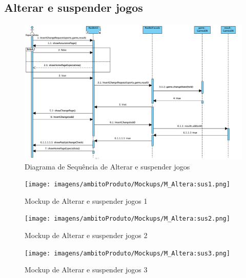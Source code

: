 \subsection{Alterar e suspender jogos}
\begin{figure}[H]
\centering
\includegraphics[width=1\textwidth]{imagens/ambitoProduto/S_alterar.png}
\caption{Diagrama de Sequência de Alterar e suspender jogos}
\end{figure}
\begin{figure}[H]
\centering
\texttt{[image: imagens/ambitoProduto/Mockups/M\_Altera:sus1.png]}
\caption{Mockup de Alterar e suspender jogos 1}
\end{figure}
\begin{figure}[H]
\centering
\texttt{[image: imagens/ambitoProduto/Mockups/M\_Altera:sus2.png]}
\caption{Mockup de Alterar e suspender jogos 2}
\end{figure}
\begin{figure}[H]
\centering
\texttt{[image: imagens/ambitoProduto/Mockups/M\_Altera:sus3.png]}
\caption{Mockup de Alterar e suspender jogos 3}
\end{figure}